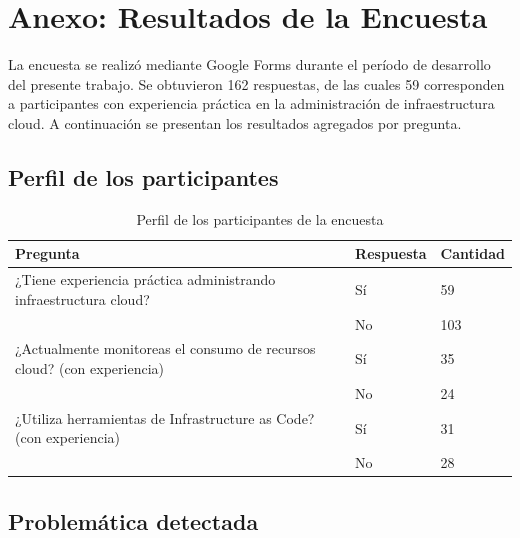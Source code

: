 \documentclass[a4paper, 12pt, oneside, openany]{book}
\begin{document}

\chapter{Anexo: Resultados de la Encuesta}

La encuesta se realizó mediante Google Forms durante el período de desarrollo del presente trabajo. Se obtuvieron 162 respuestas, de las cuales 59 corresponden a participantes con experiencia práctica en la administración de infraestructura cloud. A continuación se presentan los resultados agregados por pregunta.

\section{Perfil de los participantes}

\begin{table}[H]
\centering
\scriptsize
\caption{Perfil de los participantes de la encuesta}
\label{tab:enc-perfil}
\begin{tabular}{|p{8cm}|p{2cm}|p{2.5cm}|}
\hline
\textbf{Pregunta} & \textbf{Respuesta} & \textbf{Cantidad} \\
\hline
¿Tiene experiencia práctica administrando infraestructura cloud? & Sí & 59 \\
& No & 103 \\
\hline
¿Actualmente monitoreas el consumo de recursos cloud? (con experiencia) & Sí & 35 \\
& No & 24 \\
\hline
¿Utiliza herramientas de Infrastructure as Code? (con experiencia) & Sí & 31 \\
& No & 28 \\
\hline
\end{tabular}
\end{table}

\section{Problemática detectada}
\end{document}
